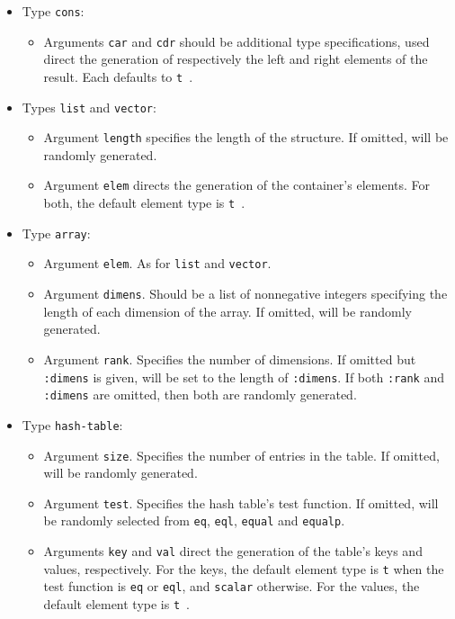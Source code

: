 \begin{itemize}
\item Type \texttt{cons}:
  \begin{itemize}
  \item Arguments \texttt{car} and \texttt{cdr} should be additional
    type specifications, used direct the generation of respectively
    the left and right elements of the result.  Each defaults to
    \texttt{t}~.
  \end{itemize}
  
\item Types \texttt{list} and \texttt{vector}:
  \begin{itemize}
  \item Argument \texttt{length} specifies the length of the structure.
    If omitted, will be randomly generated.
  \item Argument \texttt{elem} directs the generation of the
    container's elements.  For both, the default element type is
    \texttt{t}~.
  \end{itemize}

\item Type \texttt{array}:
  \begin{itemize}
  \item Argument \texttt{elem}.  As for \texttt{list} and
    \texttt{vector}.
  \item Argument \texttt{dimens}.  Should be a list of nonnegative
    integers specifying the length of each dimension of the array.  If
    omitted, will be randomly generated.
  \item Argument \texttt{rank}.  Specifies the number of dimensions.
    If omitted but \texttt{:dimens} is given, will be set to the
    length of \texttt{:dimens}.  If both \texttt{:rank} and
    \texttt{:dimens} are omitted, then both are randomly generated.
  \end{itemize}
  
\item Type \texttt{hash-table}:
  \begin{itemize}
  \item Argument \texttt{size}.  Specifies the number of entries in
    the table.  If omitted, will be randomly generated.
  \item Argument \texttt{test}.  Specifies the hash table's test
    function.  If omitted, will be randomly selected from \texttt{eq},
    \texttt{eql}, \texttt{equal} and
    \texttt{equalp}.
  \item Arguments \texttt{key} and \texttt{val} direct the generation
    of the table's keys and values, respectively.  For the keys, the
    default element type is \texttt{t} when the test function is
    \texttt{eq} or \texttt{eql}, and \texttt{scalar} otherwise.  For
    the values, the default element type is \texttt{t}~.
  \end{itemize}
\end{itemize}

